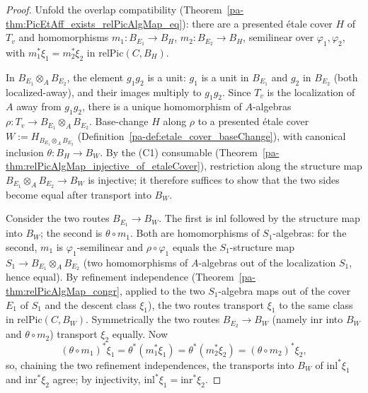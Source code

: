 \begin{proof}
  \leanok
  Unfold the overlap compatibility (Theorem~\ref{pa-thm:PicEtAff_exists_relPicAlgMap_eq}): there are a
  presented \'etale cover \(H\) of \(T_v\) and homomorphisms \(m_1 \colon B_{E_1} \to B_H\),
  \(m_2 \colon B_{E_2} \to B_H\), semilinear over \(\varphi_1, \varphi_2\), with \(m_1^{*}\xi_1 =
  m_2^{*}\xi_2\) in \(\mathrm{relPic}(C, B_H)\).

  In \(B_{E_1} \otimes_A B_{E_2}\), the element \(g_1 g_2\) is a unit: \(g_1\) is a unit in
  \(B_{E_1}\) and \(g_2\) in \(B_{E_2}\) (both localized-away), and their images multiply to
  \(g_1 g_2\). Since \(T_v\) is the localization of \(A\) away from \(g_1 g_2\), there is a unique
  homomorphism of \(A\)-algebras \(\rho \colon T_v \to B_{E_1} \otimes_A B_{E_2}\). Base-change \(H\)
  along \(\rho\) to a presented \'etale cover \(W := H_{B_{E_1} \otimes_A B_{E_2}}\)
  (Definition~\ref{pa-def:etale_cover_baseChange}), with canonical inclusion \(\theta \colon B_H \to
  B_W\). By the (C1) consumable (Theorem~\ref{pa-thm:relPicAlgMap_injective_of_etaleCover}), restriction
  along the structure map \(B_{E_1} \otimes_A B_{E_2} \to B_W\) is injective; it therefore suffices
  to show that the two sides become equal after transport into \(B_W\).

  Consider the two routes \(B_{E_1} \to B_W\). The first is \(\mathrm{inl}\) followed by the
  structure map into \(B_W\); the second is \(\theta \circ m_1\). Both are homomorphisms of
  \(S_1\)-algebras: for the second, \(m_1\) is \(\varphi_1\)-semilinear and \(\rho \circ \varphi_1\)
  equals the \(S_1\)-structure map \(S_1 \to B_{E_1} \otimes_A B_{E_2}\) (two homomorphisms of
  \(A\)-algebras out of the localization \(S_1\), hence equal). By refinement independence
  (Theorem~\ref{pa-thm:relPicAlgMap_congr}, applied to the two \(S_1\)-algebra maps out of the cover
  \(E_1\) of \(S_1\) and the descent class \(\xi_1\)), the two routes transport \(\xi_1\) to the
  same class in \(\mathrm{relPic}(C, B_W)\). Symmetrically the two routes \(B_{E_2} \to B_W\)
  (namely \(\mathrm{inr}\) into \(B_W\) and \(\theta \circ m_2\)) transport \(\xi_2\) equally. Now
  \[
    (\theta \circ m_1)^{*}\xi_1 = \theta^{*}(m_1^{*}\xi_1) = \theta^{*}(m_2^{*}\xi_2)
      = (\theta \circ m_2)^{*}\xi_2 ,
  \]
  so, chaining the two refinement independences, the transports into \(B_W\) of
  \(\mathrm{inl}^{*}\xi_1\) and \(\mathrm{inr}^{*}\xi_2\) agree; by injectivity,
  \(\mathrm{inl}^{*}\xi_1 = \mathrm{inr}^{*}\xi_2\).
\end{proof}

